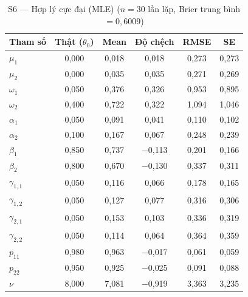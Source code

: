 \documentclass[11pt,a4paper]{article}
\begin{document}
\begin{table}[H]\centering\scriptsize
\caption{S6 --- Hợp lý cực đại (MLE) ($n=30$ lần lặp, Brier trung bình $=0{,}6009$)}
\begin{tabularx}{\textwidth}{l C C C C C}
\toprule
\textbf{Tham số} & \textbf{Thật ($\theta_0$)} & \textbf{Mean} & \textbf{Độ chệch} & \textbf{RMSE} & \textbf{SE} \\
\midrule
$\mu_1$ & 0{,}000 & 0{,}018 & 0{,}018 & 0{,}273 & 0{,}273 \\
$\mu_2$ & 0{,}000 & 0{,}035 & 0{,}035 & 0{,}271 & 0{,}269 \\
$\omega_1$ & 0{,}050 & 0{,}376 & 0{,}326 & 0{,}953 & 0{,}895 \\
$\omega_2$ & 0{,}400 & 0{,}722 & 0{,}322 & 1{,}094 & 1{,}046 \\
$\alpha_1$ & 0{,}050 & 0{,}091 & 0{,}041 & 0{,}110 & 0{,}102 \\
$\alpha_2$ & 0{,}100 & 0{,}167 & 0{,}067 & 0{,}248 & 0{,}239 \\
$\beta_1$ & 0{,}850 & 0{,}737 & $-$0{,}113 & 0{,}201 & 0{,}166 \\
$\beta_2$ & 0{,}800 & 0{,}670 & $-$0{,}130 & 0{,}337 & 0{,}311 \\
$\gamma_{1,1}$ & 0{,}050 & 0{,}116 & 0{,}066 & 0{,}178 & 0{,}165 \\
$\gamma_{1,2}$ & 0{,}050 & 0{,}127 & 0{,}077 & 0{,}316 & 0{,}306 \\
$\gamma_{2,1}$ & 0{,}050 & 0{,}153 & 0{,}103 & 0{,}336 & 0{,}319 \\
$\gamma_{2,2}$ & 0{,}050 & 0{,}114 & 0{,}064 & 0{,}364 & 0{,}359 \\
$p_{11}$ & 0{,}980 & 0{,}963 & $-$0{,}017 & 0{,}061 & 0{,}059 \\
$p_{22}$ & 0{,}950 & 0{,}925 & $-$0{,}025 & 0{,}091 & 0{,}088 \\
$\nu$ & 8{,}000 & 7{,}081 & $-$0{,}919 & 3{,}363 & 3{,}235 \\
\bottomrule
\end{tabularx}
\end{table}
\end{document}
